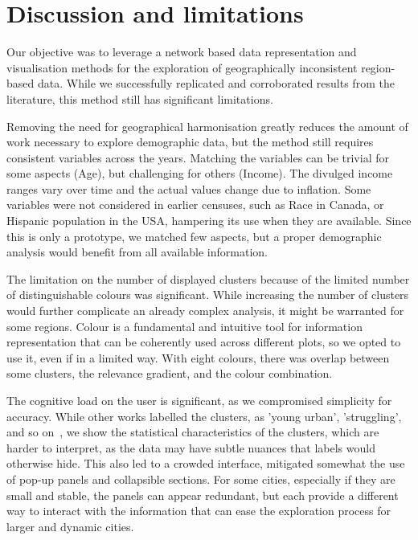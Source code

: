 \section{Discussion and limitations}
\label{sec:discussion}

Our objective was to leverage a network based data representation and
visualisation methods for the exploration of geographically inconsistent
region-based data. While we successfully replicated and corroborated results
from the literature, this method still has significant limitations. 


Removing the need for geographical harmonisation greatly reduces the amount of
work necessary to explore demographic data, but the method still requires
consistent variables across the years. Matching the variables can be trivial for
some aspects (Age), but challenging for others (Income). The divulged income
ranges vary over time and the actual values change due to inflation. Some
variables were not considered in earlier censuses, such as Race in Canada, or
Hispanic population in the USA, hampering its use when they are available. Since
this is only a prototype, we matched few aspects, but a proper demographic
analysis would benefit from all available information. 

The limitation on the number of displayed clusters because of the limited number
of distinguishable colours was significant. While increasing the number of
clusters would further complicate an already complex analysis, it might be
warranted for some regions. Colour is a fundamental and intuitive tool for
information representation that can be coherently used across different plots,
so we opted to use it, even if in a limited way. With eight colours, there was
overlap between some clusters, the relevance gradient, and the colour
combination. 


The cognitive load on the user is significant, as we compromised simplicity for
accuracy. While other works labelled the clusters, as 'young urban',
'struggling', and so on~\citep{Delmelle2016,Delmelle2017}, we show the
statistical characteristics of the clusters, which are harder to interpret, as
the data may have subtle nuances that labels would otherwise hide. This also led
to a crowded interface, mitigated somewhat the use of pop-up panels and
collapsible sections. For some cities, especially if they are small and stable,
the panels can appear redundant, but each provide a different way to interact
with the information that can ease the exploration process for larger and
dynamic cities.